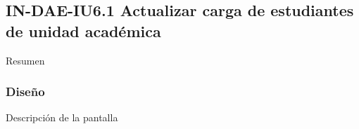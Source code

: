 \subsection{IN-DAE-IU6.1 Actualizar carga de estudiantes de unidad académica}

Resumen

\subsubsection{Diseño}

Descripción de la pantalla 



